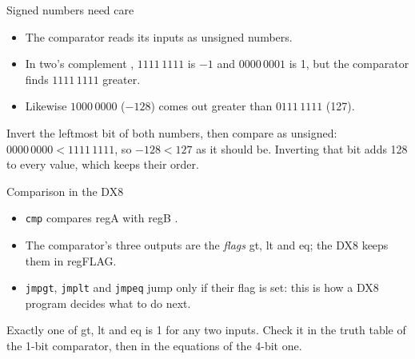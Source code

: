 \documentclass[10pt]{wosm-slides}
\begin{document}
\begin{frame}{Signed numbers need care}
  \begin{itemize}
    \item The comparator reads its inputs as \alert{unsigned} numbers.
    \item In two's complement , $1111\,1111$ is $-1$ and $0000\,0001$ is
      1, but the comparator finds $1111\,1111$ greater.
    \item Likewise $1000\,0000$ ($-128$) comes out greater than $0111\,1111$ (127).
  \end{itemize}

  \begin{remark}
    Invert the leftmost bit of both numbers, then compare as unsigned:
    $0000\,0000 < 1111\,1111$, so $-128 < 127$ as it should be. Inverting that bit
    adds 128 to every value, which keeps their order.
  \end{remark}
\end{frame}

\begin{frame}{Comparison in the DX8}
  \begin{itemize}
    \item \texttt{cmp} compares regA with regB .
    \item The comparator's three outputs are the \emph{flags} gt, lt and eq; the DX8
      keeps them in regFLAG.
    \item \texttt{jmpgt}, \texttt{jmplt} and \texttt{jmpeq} jump only if their flag
      is set: this is how a DX8 program decides what to do next.
  \end{itemize}

  \begin{remark}
    Exactly one of gt, lt and eq is 1 for any two inputs. Check it in the truth table
    of the 1-bit comparator, then in the equations of the 4-bit one.
  \end{remark}
\end{frame}
\end{document}
